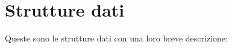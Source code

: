 \section{Strutture dati}
Queste sono le strutture dati con una loro breve descrizione\+:\begin{DoxyCompactList}
\item{}
\end{DoxyCompactList}
